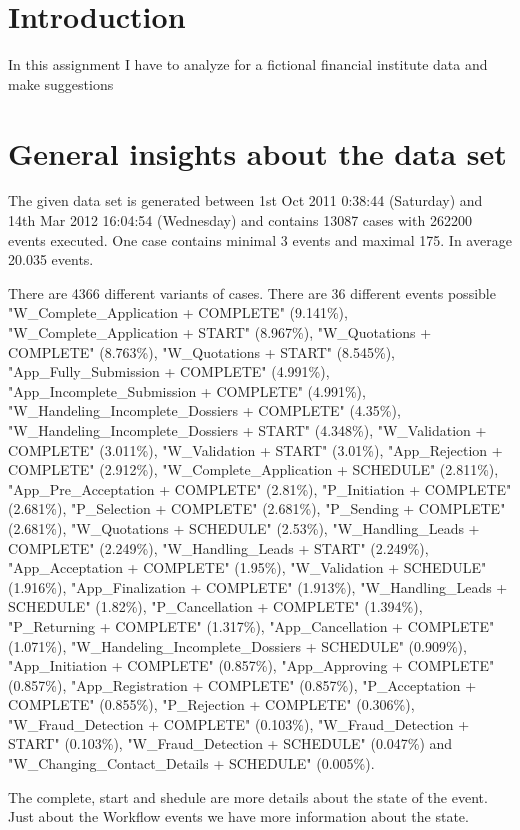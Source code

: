 \section{Introduction}
In this assignment I have to analyze for a fictional financial institute data and make suggestions 

\section{General insights about the data set}

The given data set is generated between 1st Oct 2011 0:38:44 (Saturday) and 14th Mar 2012 16:04:54 (Wednesday) and contains 13087 cases with 262200 events executed. One case contains minimal 3 events and maximal 175. In average 20.035 events.

There are 4366 different variants of cases. There are 36 different events possible 
"W\_Complete\_Application + COMPLETE" (9.141\%), "W\_Complete\_Application + START" (8.967\%), "W\_Quotations + COMPLETE" (8.763\%), "W\_Quotations + START" (8.545\%), "App\_Fully\_Submission + COMPLETE" (4.991\%), "App\_Incomplete\_Submission + COMPLETE" (4.991\%), "W\_Handeling\_Incomplete\_Dossiers + COMPLETE" (4.35\%), "W\_Handeling\_Incomplete\_Dossiers + START" (4.348\%), "W\_Validation + COMPLETE" (3.011\%), "W\_Validation + START" (3.01\%), "App\_Rejection + COMPLETE" (2.912\%), "W\_Complete\_Application + SCHEDULE" (2.811\%), "App\_Pre\_Acceptation + COMPLETE" (2.81\%), "P\_Initiation + COMPLETE" (2.681\%), "P\_Selection + COMPLETE" (2.681\%), "P\_Sending + COMPLETE" (2.681\%), "W\_Quotations + SCHEDULE" (2.53\%), "W\_Handling\_Leads + COMPLETE" (2.249\%), "W\_Handling\_Leads + START" (2.249\%), "App\_Acceptation + COMPLETE" (1.95\%), "W\_Validation + SCHEDULE" (1.916\%), "App\_Finalization + COMPLETE" (1.913\%), "W\_Handling\_Leads + SCHEDULE" (1.82\%), "P\_Cancellation + COMPLETE" (1.394\%), "P\_Returning + COMPLETE" (1.317\%), "App\_Cancellation + COMPLETE" (1.071\%), "W\_Handeling\_Incomplete\_Dossiers + SCHEDULE" (0.909\%), "App\_Initiation + COMPLETE" (0.857\%), "App\_Approving + COMPLETE" (0.857\%), "App\_Registration + COMPLETE" (0.857\%), "P\_Acceptation + COMPLETE" (0.855\%), "P\_Rejection + COMPLETE" (0.306\%), "W\_Fraud\_Detection + COMPLETE" (0.103\%), "W\_Fraud\_Detection + START" (0.103\%), "W\_Fraud\_Detection + SCHEDULE" (0.047\%) and "W\_Changing\_Contact\_Details + SCHEDULE" (0.005\%).

The complete, start and shedule are more details about the state of the event. Just about the Workflow events we have more information about the state. 

